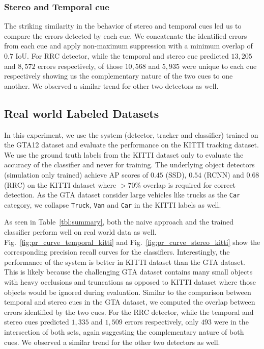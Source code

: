 \documentclass[letterpaper, 10 pt, journal, twoside]{IEEEtran}  %
\begin{document}
\subsubsection{Stereo and Temporal cue}
The striking similarity in the behavior of stereo and temporal cues led us to compare the errors detected by each cue. 
We concatenate the identified errors from each cue and apply non-maximum suppression with a minimum overlap of $0.7$ IoU. For RRC detector, while the temporal and stereo cue predicted $13,205$ and $8,572$ errors respectively, of those $10,568$ and $5,935$ were unique to each cue respectively showing us the complementary nature of the two cues to one another. We observed a similar trend for other two detectors as well. 

\subsection{Real world Labeled Datasets}
\label{sec:real_data}

In this experiment, we use the system (detector, tracker and classifier) trained on the GTA12 dataset and evaluate the performance on the KITTI tracking dataset. We use the ground truth labels from the KITTI dataset only to evaluate the accuracy of the classifier and never for training. 
The underlying object detectors (simulation only trained) achieve AP scores of $0.45$ (SSD), $0.54$ (RCNN) and $0.68$ (RRC) on the KITTI dataset where $>70\%$ overlap is required for correct detection. As the GTA dataset consider large vehicles like trucks as the \texttt{Car} category, we collapse \texttt{Truck}, \texttt{Van} and \texttt{Car} in the KITTI labels as well. 

As seen in Table~\ref{tbl:summary}, both the naive approach and the trained classifier perform well on real world data as well. Fig.~\ref{fig:pr_curve_temporal_kitti} and Fig.~\ref{fig:pr_curve_stereo_kitti} show the corresponding precision recall curves for the classifiers. Interestingly, the performance of the system is better in KITTI dataset than the GTA dataset. This is likely because the challenging GTA dataset contains many small objects with heavy occlusions and truncations as opposed to KITTI dataset where those objects would be ignored during evaluation. Similar to the comparison between temporal and stereo cues in the GTA dataset, we computed the overlap between errors identified by the two cues. For the RRC detector, while the temporal and stereo cues predicted $1,335$ and $1,509$ errors respectively, only $493$ were in the intersection of both sets, again suggesting the complementary nature of both cues. We observed a similar trend for the other two detectors as well. 
\end{document}
